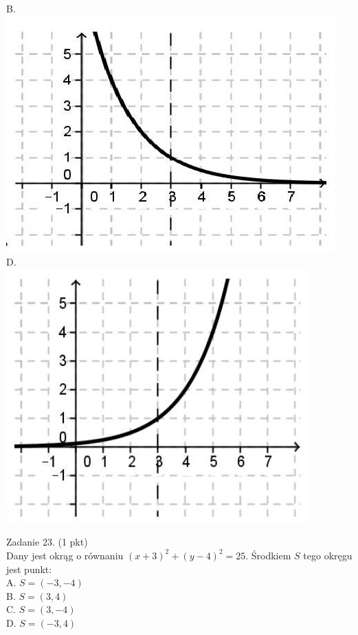 \documentclass[10pt]{article}
\begin{document}
B.\\
\includegraphics[max width=\textwidth, center]{2024_11_21_9a9f600c3b3af5013d80g-08(1)}\\
D.\\
\includegraphics[max width=\textwidth, center]{2024_11_21_9a9f600c3b3af5013d80g-08}

Zadanie 23. (1 pkt)\\
Dany jest okrąg o równaniu \((x+3)^{2}+(y-4)^{2}=25\). Środkiem \(S\) tego okręgu jest punkt:\\
A. \(S=(-3,-4)\)\\
B. \(S=(3,4)\)\\
C. \(S=(3,-4)\)\\
D. \(S=(-3,4)\)
\end{document}
